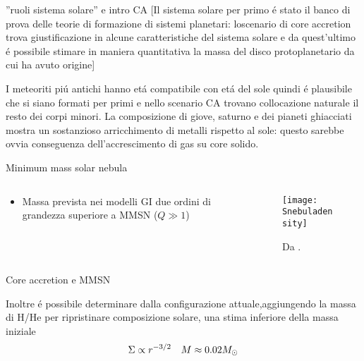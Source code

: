 \begin{wordonframe}{''ruoli sistema solare'' e intro CA}
[Il sistema solare per primo \'e stato il banco di prova delle teorie di formazione di sistemi planetari: loscenario di core accretion trova giustificazione in alcune caratteristiche del sistema solare e da quest'ultimo \'e possibile stimare in maniera quantitativa la massa del disco protoplanetario da cui ha avuto origine]

I meteoriti pi\'u antichi hanno et\'a compatibile con et\'a del sole quindi \'e plausibile che si siano formati per primi e nello scenario CA trovano collocazione naturale il resto dei corpi minori.
La composizione di giove, saturno e dei pianeti ghiacciati mostra un sostanzioso arricchimento di metalli rispetto al sole: questo sarebbe ovvia conseguenza dell'accrescimento di gas su core solido.

\end{wordonframe}

\begin{frame}{Minimum mass solar nebula}
\begin{columns}[T]
	\begin{column}{0.45\textwidth}
\begin{itemize}
	\item Massa prevista nei modelli GI due ordini di grandezza superiore a MMSN ($Q\gg1$)
\end{itemize}
	\end{column}
	\begin{column}{0.54\textwidth}
			\begin{figure}[!ht]
			\texttt{[image: Snebuladensity]}
			\caption{Da \cite{weidenschilling1977distribution}.}\label{fig:Snebuladensity}
		\end{figure}
	\end{column}
\end{columns}
\end{frame}

\begin{wordonframe}{Core accretion e MMSN}

Inoltre \'e possibile determinare dalla configurazione attuale,aggiungendo la massa di H/He per ripristinare composizione solare, una stima inferiore della massa iniziale 
\begin{align*}
&\Sigma\propto r^{-3/2}
&M\approx0.02M_{\odot}{}
\end{align*}

\end{wordonframe}

